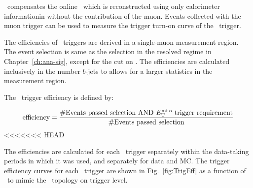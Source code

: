 \par \METnomu~compensates the online \MET~which is reconstructed using only calorimeter informationin without the contribution of the muon.
Events collected with the muon trigger can be used to measure the trigger turn-on curve of the \MET~trigger. 

\par The efficiencies of \MET~triggers are derived in a single-muon measurement region.
The event selection is same as the selection in the resolved regime in Chapter~\ref{ch:ana-sig}, except for the cut on \met.
The efficiencies are calculated inclusively in the number $b$-jets to allows for a larger statistics in the measurement region.


\par The \MET~trigger efficiency is defined by:

\begin{equation}
\label{eq:trigeff}
\text{efficiency} = \frac{\text{\#Events passed selection AND \ensuremath{E_{\mathrm{T}}^{\mathrm{miss}}}~trigger requirement}}{\text{\#Events passed selection}}
\end{equation}
<<<<<<< HEAD

\par The efficiencies are calculated for each \MET~trigger separately within the data-taking periods in which it was used, and separately for data and MC.
 The trigger efficiency curves for each \MET~trigger are shown in Fig.~\ref{fig:TrigEff} as a function of \METnomu~to mimic the \MET~topology on trigger level.

